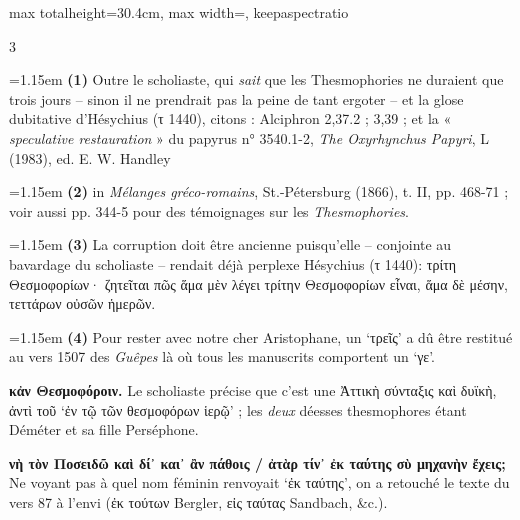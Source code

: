 \documentclass[11pt,twoside]{book}
\newcommand{\italique}[1]{\textit{#1}}
\newcommand{\anglais}[1]{\textit{#1}}
\begin{document}
\begin{adjustbox}{max totalheight=30.4cm, max width=\textwidth, keepaspectratio}
\begin{minipage}{\textwidth}
{\begin{multicols}{3}
\par\vspace{1.2pt}\par\nopagebreak\vspace{1pt}\noindent\hangindent=1.15em {\color{sepiaNote}\textbf{(1)}} Outre le scholiaste, qui \italique{sait} que les Thesmophories ne duraient que trois jours – sinon il ne prendrait pas la peine de tant ergoter -- et la glose dubitative d'Hésychius (τ 1440), citons : Alciphron 2,37.2 ; 3,39 ; et la « \anglais{speculative restauration} » du papyrus n° 3540.1-2, \italique{The Oxyrhynchus Papyri}, L (1983), ed. E. W. Handley
\par\vspace{1.5pt}
\noindent\hangindent=1.15em {\color{sepiaNote}\textbf{(2)}} in \italique{Mélanges gréco-romains}, St.-Pétersburg (1866), t. II, pp. 468-71 ; voir aussi pp. 344-5 pour des témoignages sur les \italique{Thesmophories}.
\par\vspace{1.5pt}
\noindent\hangindent=1.15em {\color{sepiaNote}\textbf{(3)}} La corruption doit être ancienne puisqu'elle – conjointe au bavardage du scholiaste – rendait déjà perplexe Hésychius (τ 1440): τρίτη Θεσμοφορίων· ζητεῖται πῶς ἅμα μὲν λέγει τρίτην Θεσμοφορίων εἶναι, ἅμα δὲ μέσην, τεττάρων οὐσῶν ἡμερῶν.
\par\vspace{1.5pt}
\noindent\hangindent=1.15em {\color{sepiaNote}\textbf{(4)}} Pour rester avec notre cher Aristophane, un `τρεῖς' a dû être restitué au vers 1507 des \italique{Guêpes} là où tous les manuscrits comportent un `γε'.
\par\vspace{1.5pt}
 \textbf{κἀν Θεσμοφόροιν.} Le scholiaste précise que c'est une Ἀττικὴ σύνταξις καὶ δυϊκὴ, ἀντὶ τοῦ `ἐν τῷ τῶν θεσμοφόρων ἱερῷ' ; les \italique{deux} déesses thesmophores étant Déméter et sa fille Perséphone.
\par\vspace{1.5pt}
 \textbf{νὴ τὸν Ποσειδῶ καὶ δί᾽ και᾽ ἂν πάθοις / ἀτὰρ τίν᾽ ἐκ ταύτης σὺ μηχανὴν ἔχεις;} Ne voyant pas à quel nom féminin renvoyait `ἐκ ταύτης', on a retouché le texte du vers 87 à l'envi (ἐκ τούτων Bergler, εἰς ταύτας Sandbach, \&c.).
\par\vspace{1.5pt}

\end{multicols}}
\end{minipage}
\end{adjustbox}
\end{document}
